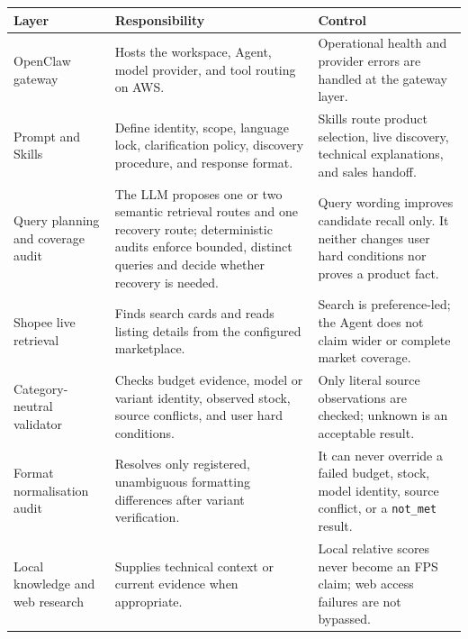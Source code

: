 \documentclass[11pt,letterpaper]{article}
\newcommand{\thead}[1]{\bfseries\centering #1\arraybackslash}
\begin{document}
\begin{tabularx}{\textwidth}{@{}p{1.36in}Y Y@{}}
\thead{Layer} & \thead{Responsibility} & \thead{Control} \\
\toprule
OpenClaw gateway & Hosts the workspace, Agent, model provider, and tool routing on AWS. & Operational health and provider errors are handled at the gateway layer. \\
Prompt and Skills & Define identity, scope, language lock, clarification policy, discovery procedure, and response format. & Skills route product selection, live discovery, technical explanations, and sales handoff. \\
Query planning and coverage audit & The LLM proposes one or two semantic retrieval routes and one recovery route; deterministic audits enforce bounded, distinct queries and decide whether recovery is needed. & Query wording improves candidate recall only. It neither changes user hard conditions nor proves a product fact. \\
Shopee live retrieval & Finds search cards and reads listing details from the configured marketplace. & Search is preference-led; the Agent does not claim wider or complete market coverage. \\
Category-neutral validator & Checks budget evidence, model or variant identity, observed stock, source conflicts, and user hard conditions. & Only literal source observations are checked; unknown is an acceptable result. \\
Format normalisation audit & Resolves only registered, unambiguous formatting differences after variant verification. & It can never override a failed budget, stock, model identity, source conflict, or a \texttt{not\_met} result. \\
Local knowledge and web research & Supplies technical context or current evidence when appropriate. & Local relative scores never become an FPS claim; web access failures are not bypassed. \\
\bottomrule
\end{tabularx}
\end{document}
